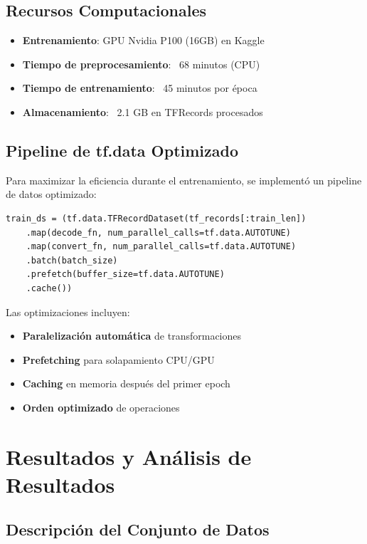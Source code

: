 \documentclass[12pt,a4paper]{article}
\begin{document}
\subsection{Recursos Computacionales}

\begin{itemize}
    \item \textbf{Entrenamiento}: GPU Nvidia P100 (16GB) en Kaggle
    \item \textbf{Tiempo de preprocesamiento}: ~68 minutos (CPU)
    \item \textbf{Tiempo de entrenamiento}: ~45 minutos por época
    \item \textbf{Almacenamiento}: ~2.1 GB en TFRecords procesados
\end{itemize}

\subsection{Pipeline de tf.data Optimizado}

Para maximizar la eficiencia durante el entrenamiento, se implementó un pipeline de datos optimizado:

\begin{lstlisting}[style=python, caption=Pipeline de datos optimizado]
train_ds = (tf.data.TFRecordDataset(tf_records[:train_len])
    .map(decode_fn, num_parallel_calls=tf.data.AUTOTUNE)
    .map(convert_fn, num_parallel_calls=tf.data.AUTOTUNE)  
    .batch(batch_size)
    .prefetch(buffer_size=tf.data.AUTOTUNE)
    .cache())
\end{lstlisting}

Las optimizaciones incluyen:
\begin{itemize}
    \item \textbf{Paralelización automática} de transformaciones
    \item \textbf{Prefetching} para solapamiento CPU/GPU
    \item \textbf{Caching} en memoria después del primer epoch
    \item \textbf{Orden optimizado} de operaciones
\end{itemize}

\section{Resultados y Análisis de Resultados}

\subsection{Descripción del Conjunto de Datos}
\end{document}

